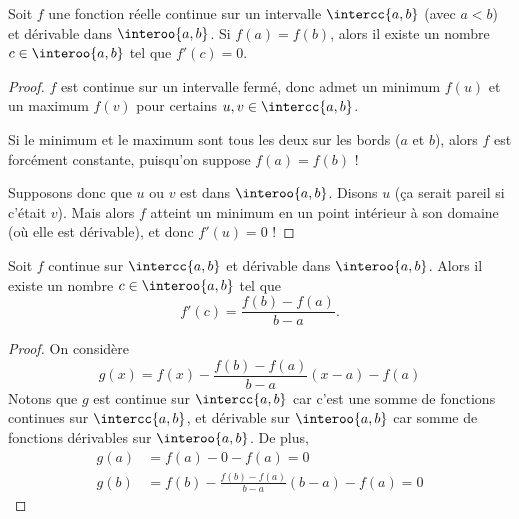 \begin{frame}
  \begin{theorem}
    Soit $f$ une fonction réelle continue sur un intervalle $\intercc{a,b}$ (avec \(a < b\)) et dérivable dans $\interoo{a,b}$. Si $f(a)=f(b)$, alors il existe un nombre $c \in \interoo{a,b}$ tel que $f'(c)=0$.
  \end{theorem}
  \begin{proof}%
    \(f\) est continue sur un intervalle fermé, donc admet un minimum \(f(u)\) et un maximum \(f(v)\) pour certains \(u,v \in \intercc{a,b}\).\pause

    Si le minimum et le maximum sont tous les deux sur les bords (\(a\) et \(b\)), alors \(f\) est forcément constante, puisqu'on suppose \(f(a) = f(b)\) !\pause{}

    Supposons donc que \(u\) ou \(v\) est dans \(\interoo{a,b}\).\pause{} Disons \(u\) (ça serait pareil si c'était \(v\)).\pause{} Mais alors \(f\) atteint un minimum en un point intérieur à son domaine (où elle est dérivable)\pause{}, et donc \(f'(u) = 0\) !
  \end{proof}
\end{frame}
\begin{frame}
  \begin{theorem}
    Soit $f$ continue sur $\intercc{a,b}$ et dérivable dans $\interoo{a,b}$. Alors il existe un nombre $c \in \interoo{a,b}$ tel que
    \begin{equation*}
      f'(c) = \frac{f(b)-f(a)}{b-a}.
    \end{equation*}
  \end{theorem}
  \begin{proof}On considère
    \begin{equation*}
      g(x) = f(x) - \frac{f(b)-f(a)}{b-a}(x-a) - f(a)
    \end{equation*}\pause
    Notons que $g$ est continue sur $\intercc{a,b}$ car c'est une somme de fonctions continues sur $\intercc{a,b}$\pause, et dérivable sur $\interoo{a,b}$ car somme de fonctions dérivables sur $\interoo{a,b}$.\pause{} De plus,
    \begin{align*}
      g(a) &= f(a) - 0 - f(a) = 0\\
      g(b) &= f(b) - \frac{f(b)-f(a)}{b-a}(b-a) - f(a) = 0
    \end{align*}\noqed
  \end{proof}
\end{frame}
